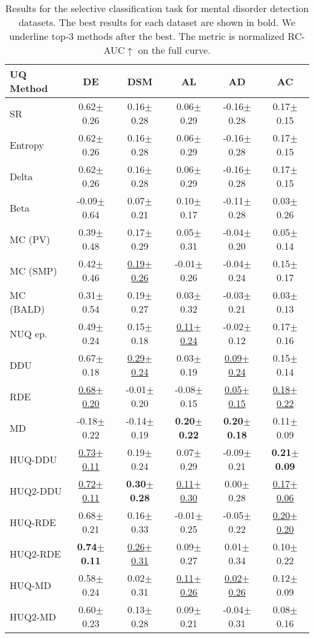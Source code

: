 \begin{table*}[!ht]
\centering%
\begin{tabular}{l|c|c|c|c|c}
\toprule
\textbf{UQ Method} & \textbf{DE} & \textbf{DSM} & \textbf{AL} & \textbf{AD} & \textbf{AC} \\
\midrule

SR & 0.62$\pm$0.26 & 0.16$\pm$0.28 & 0.06$\pm$0.29 & -0.16$\pm$0.28 & 0.17$\pm$0.15 \\
Entropy & 0.62$\pm$0.26 & 0.16$\pm$0.28 & 0.06$\pm$0.29 & -0.16$\pm$0.28 & 0.17$\pm$0.15 \\
Delta & 0.62$\pm$0.26 & 0.16$\pm$0.28 & 0.06$\pm$0.29 & -0.16$\pm$0.28 & 0.17$\pm$0.15 \\
Beta & -0.09$\pm$0.64 & 0.07$\pm$0.21 & 0.10$\pm$0.17 & -0.11$\pm$0.28 & 0.03$\pm$0.26 \\ \midrule
MC (PV) & 0.39$\pm$0.48 & 0.17$\pm$0.29 & 0.05$\pm$0.31 & -0.04$\pm$0.20 & 0.05$\pm$0.14 \\
MC (SMP) & 0.42$\pm$0.46 & \underline{0.19$\pm$0.26} & -0.01$\pm$0.26 & -0.04$\pm$0.24 & 0.15$\pm$0.17 \\
MC (BALD) & 0.31$\pm$0.54 & 0.19$\pm$0.27 & 0.03$\pm$0.32 & -0.03$\pm$0.21 & 0.03$\pm$0.13 \\ \midrule
NUQ ep. & 0.49$\pm$0.24 & 0.15$\pm$0.18 & \underline{0.11$\pm$0.24} & -0.02$\pm$0.12 & 0.17$\pm$0.16 \\
DDU & 0.67$\pm$0.18 & \underline{0.29$\pm$0.24} & 0.03$\pm$0.19 & \underline{0.09$\pm$0.24} & 0.15$\pm$0.14 \\
RDE & \underline{0.68$\pm$0.20} & -0.01$\pm$0.20 & -0.08$\pm$0.15 & \underline{0.05$\pm$0.15} & \underline{0.18$\pm$0.22} \\
MD & -0.18$\pm$0.22 & -0.14$\pm$0.19 & \textbf{0.20$\pm$0.22} & \textbf{0.20$\pm$0.18} & 0.11$\pm$0.09 \\ \midrule
HUQ-DDU & \underline{0.73$\pm$0.11} & 0.19$\pm$0.24 & 0.07$\pm$0.29 & -0.09$\pm$0.21 & \textbf{0.21$\pm$0.09} \\
HUQ2-DDU & \underline{0.72$\pm$0.11} & \textbf{0.30$\pm$0.28} & \underline{0.11$\pm$0.30} & 0.00$\pm$0.28 & \underline{0.17$\pm$0.06} \\
HUQ-RDE & 0.68$\pm$0.21 & 0.16$\pm$0.33 & -0.01$\pm$0.25 & -0.05$\pm$0.22 & \underline{0.20$\pm$0.20} \\
HUQ2-RDE & \textbf{0.74$\pm$0.11} & \underline{0.26$\pm$0.31} & 0.09$\pm$0.27 & 0.01$\pm$0.34 & 0.10$\pm$0.22 \\
HUQ-MD & 0.58$\pm$0.24 & 0.02$\pm$0.31 & \underline{0.11$\pm$0.26} & \underline{0.02$\pm$0.26} & 0.12$\pm$0.09 \\
HUQ2-MD & 0.60$\pm$0.23 & 0.13$\pm$0.28 & 0.09$\pm$0.21 & -0.04$\pm$0.31 & 0.08$\pm$0.16 \\
\bottomrule
\end{tabular}
\caption{\label{tab:psy_ue_rubioroberta_100}Results for the selective classification task for mental disorder detection datasets. The best results for each dataset are shown in bold. We underline top-3 methods after the best. The metric is normalized RC-AUC$\uparrow$ on the full curve.}
\end{table*}


